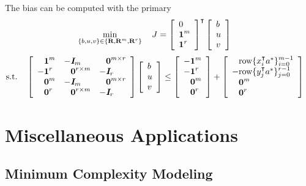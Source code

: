 \documentclass{article}
\begin{document}
    The bias can be computed with the primary \LP
    \begin{align*}
        \min_{\{b,u,v\}\in\{\textbf{R},\textbf{R}^m,\textbf{R}^r\}}  \quad J 
        & = \left[\begin{array}{lllllllllllllllllll}
            0\\
            \textbf{1}^{m}\\
            \textbf{1}^{r}
        \end{array}\right]^\intercal
        \left[\begin{array}{lllllllllllllllllll}
            b\\
            u\\
            v\\
        \end{array}\right]
    \end{align*}
    \begin{align*}
        \st\quad
        \mat{
            \minus\ones^m & -\eye_m & \minus\zeros^{m\times r}\\
            -\ones^r & \minus\zeros^{r\times m} & -\eye_r \\
            \minus\zeros^m & -\eye_m & \minus\zeros^{m\times r}\\
            \minus\zeros^r & \minus\zeros^{r\times m} & -\eye_r
        }
        &\mat{b \\ u \\ v}
        \leq
        \mat{
            -\ones^m\\ 
            -\ones^r\\
            \minus\zeros^m\\
            \minus\zeros^r
            }
        +\mat{
            \minus\row\{x_i^\tp a^*\}_{i=0}^{m-1}\\
            -\row\{y_j^\tp a^*\}_{j=0}^{r-1}\\
            \minus\zeros^m\\
            \minus\zeros^r            
            }
    \end{align*}


\clearpage


\section{Miscellaneous Applications}

\subsection{Minimum Complexity Modeling}
\end{document}
